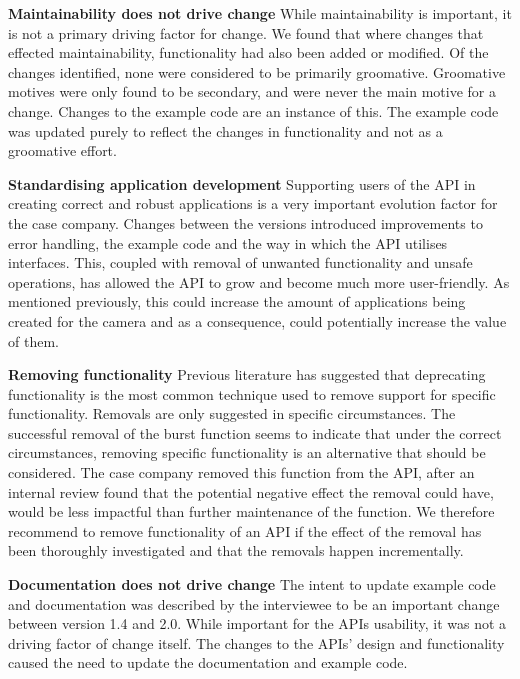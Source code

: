 \documentclass{sig-alternate}
\begin{document}
\smallskip \noindent 
\textbf{Maintainability does not drive change  }  %
While maintainability is important, it is not a primary driving factor for change. We found that where changes that effected maintainability, functionality had also been added or modified. Of the changes identified, none were considered to be primarily groomative. Groomative motives were only found to be secondary, and were never the main motive for a change. Changes to the example code are an instance of this. The example code was updated purely to reflect the changes in functionality and not as a groomative effort. 

\smallskip \noindent
\textbf{Standardising application development  } %
Supporting users of the API in creating correct and robust applications is a very important evolution factor for the case company. Changes between the versions introduced improvements to error handling, the example code and the way in which the API utilises interfaces. This, coupled with removal of unwanted functionality and unsafe operations, has allowed the API to grow and become much more user-friendly. As mentioned previously, this could increase the amount of applications being created for the camera and as a consequence, could potentially increase the value of them.

\smallskip \noindent
\textbf{Removing functionality  } %
Previous literature has suggested that deprecating functionality is the most common technique used to remove support for specific functionality. Removals are only suggested in specific circumstances. The successful removal of the burst function seems to indicate that under the correct circumstances, removing specific functionality is an alternative that should be considered. The case company removed this function from the API, after an internal review found that the potential negative effect the removal could have, would be less impactful than further maintenance of the function. We therefore recommend to remove functionality of an API if the effect of the removal has been thoroughly investigated and that the removals happen incrementally.

\smallskip \noindent
\textbf{Documentation does not drive change  } %
The intent to update example code and documentation was described by the interviewee to be an important change between version 1.4 and 2.0. While important for the APIs usability, it was not a driving factor of change itself. The changes to the APIs' design and functionality caused the need to update the documentation and example code.
\end{document}
